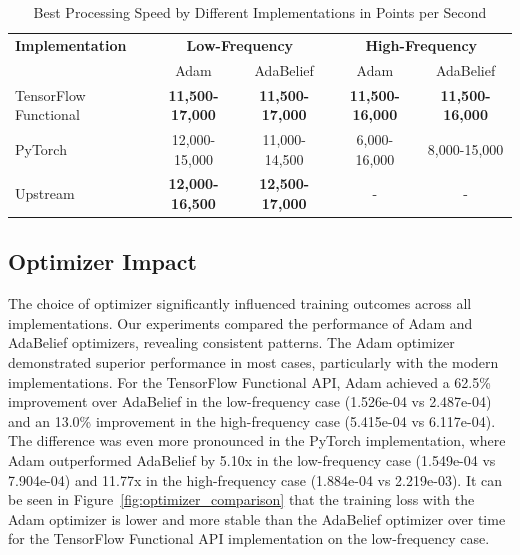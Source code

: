 \documentclass[10pt,journal,compsoc,onecolumn]{IEEEtran}
\begin{document}
\begin{table}[htbp]
    \centering
    \caption{Best Processing Speed by Different Implementations in Points per Second}
    \label{tab:best_performance}
    \begin{tabular}{lcccc}
        \hline
        \textbf{Implementation} & \multicolumn{2}{c}{\textbf{Low-Frequency}} & \multicolumn{2}{c}{\textbf{High-Frequency}} \\
        & Adam & AdaBelief & Adam & AdaBelief \\
        \hline
        TensorFlow Functional & \textbf{11,500-17,000} & \textbf{11,500-17,000} & \textbf{11,500-16,000} & \textbf{11,500-16,000} \\
        PyTorch & 12,000-15,000 & 11,000-14,500 & 6,000-16,000 & 8,000-15,000 \\
        Upstream & \textbf{12,000-16,500} & \textbf{12,500-17,000} & - & - \\
        \hline
    \end{tabular}
\end{table}

\subsection{Optimizer Impact}
The choice of optimizer significantly influenced training outcomes across all implementations. Our experiments compared the performance of Adam and AdaBelief optimizers, revealing consistent patterns. The Adam optimizer demonstrated superior performance in most cases, particularly with the modern implementations. For the TensorFlow Functional API, Adam achieved a 62.5\% improvement over AdaBelief in the low-frequency case (1.526e-04 vs 2.487e-04) and an 13.0\% improvement in the high-frequency case (5.415e-04 vs 6.117e-04). The difference was even more pronounced in the PyTorch implementation, where Adam outperformed AdaBelief by 5.10x in the low-frequency case (1.549e-04 vs 7.904e-04) and 11.77x in the high-frequency case (1.884e-04 vs 2.219e-03). It can be seen in Figure~\ref{fig:optimizer_comparison} that the training loss with the Adam optimizer is lower and more stable than the AdaBelief optimizer over time for the TensorFlow Functional API implementation on the low-frequency case.
\end{document}
